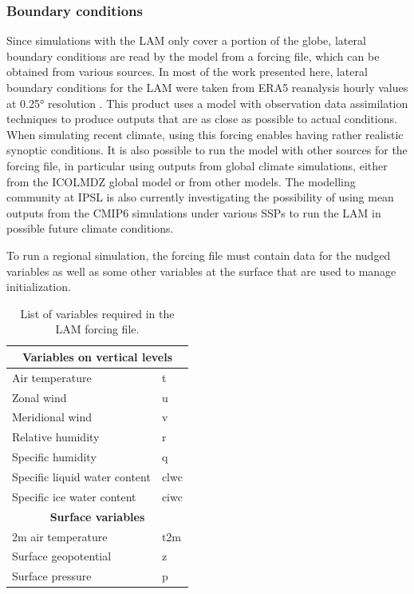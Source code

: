 \subsubsection{Boundary conditions}
Since simulations with the LAM only cover a portion of the globe, lateral boundary conditions are read by the model from a forcing file, which can be obtained from various sources. 
In most of the work presented here, lateral boundary conditions for the LAM were taken from ERA5 reanalysis hourly values at 0.25° resolution \citep{hersbach_era5_2020}.  This product uses a model with observation data assimilation techniques to produce outputs that are as close as possible to actual conditions. When simulating recent climate, using this forcing enables having rather realistic synoptic conditions. 
It is also possible to run the model with other sources for the forcing file, in particular using outputs from global climate simulations, either from the ICOLMDZ global model or from other models. The modelling community at IPSL is also currently investigating the possibility of using mean outputs from the CMIP6 simulations under various SSPs to run the LAM in possible future climate conditions.

To run a regional simulation, the forcing file must contain data for the nudged variables %
as well as some other variables at the surface that are used to manage initialization. %

\begin{table}[htbp]
\centering
\begin{tabular}{|l|l|}
\hline
\multicolumn{2}{|c|}{\textbf{Variables on vertical levels}} \\ \hline
Air temperature                & t     \\ \hline
Zonal wind                    & u     \\ \hline
Meridional wind               & v     \\ \hline
Relative humidity             & r     \\ \hline
Specific humidity             & q     \\ \hline
Specific liquid water content & clwc  \\ \hline
Specific ice water content    & ciwc  \\ \hline
\multicolumn{2}{|c|}{\textbf{Surface variables}} \\ \hline
2m air temperature            & t2m   \\ \hline
Surface geopotential          & z     \\ \hline
Surface pressure              & p     \\ \hline
\end{tabular}
\caption{List of variables required in the LAM forcing file.}
\end{table}

